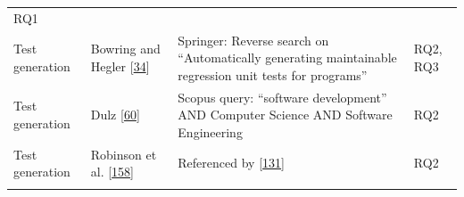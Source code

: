 \documentclass[]{book}
\begin{document}
\begin{longtable}[]{@{}llll@{}}
\begin{minipage}[t]{0.04\columnwidth}
RQ1\strut
\end{minipage}\tabularnewline
\begin{minipage}[t]{0.18\columnwidth}\raggedright\strut
Test generation\strut
\end{minipage} & \begin{minipage}[t]{0.16\columnwidth}\raggedright\strut
Bowring and Hegler
{[}\protect\hyperlink{ref-bowring2014obsidian}{34}{]}\strut
\end{minipage} & \begin{minipage}[t]{0.50\columnwidth}\raggedright\strut
Springer: Reverse search on ``Automatically generating maintainable
regression unit tests for programs''\strut
\end{minipage} & \begin{minipage}[t]{0.04\columnwidth}\raggedright\strut
RQ2, RQ3\strut
\end{minipage}\tabularnewline
\begin{minipage}[t]{0.18\columnwidth}\raggedright\strut
Test generation\strut
\end{minipage} & \begin{minipage}[t]{0.16\columnwidth}\raggedright\strut
Dulz {[}\protect\hyperlink{ref-dulz2013model}{60}{]}\strut
\end{minipage} & \begin{minipage}[t]{0.50\columnwidth}\raggedright\strut
Scopus query: ``software development'' AND Computer Science AND Software
Engineering\strut
\end{minipage} & \begin{minipage}[t]{0.04\columnwidth}\raggedright\strut
RQ2\strut
\end{minipage}\tabularnewline
\begin{minipage}[t]{0.18\columnwidth}\raggedright\strut
Test generation\strut
\end{minipage} & \begin{minipage}[t]{0.16\columnwidth}\raggedright\strut
Robinson et al. {[}\protect\hyperlink{ref-robinson2011}{158}{]}\strut
\end{minipage} & \begin{minipage}[t]{0.50\columnwidth}\raggedright\strut
Referenced by
{[}\protect\hyperlink{ref-supportingtestsuite}{131}{]}\strut
\end{minipage} & \begin{minipage}[t]{0.04\columnwidth}\raggedright\strut
RQ2\strut
\end{minipage}\tabularnewline
\begin{minipage}[t]{0.18\columnwidth}\raggedright\strut

\end{minipage}
\end{longtable}
\end{document}
